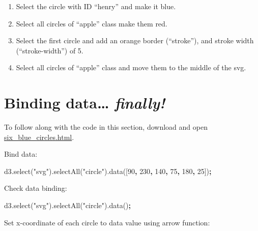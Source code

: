 \documentclass[openany]{book}
\newenvironment{Shaded}{\begin{snugshade}}{\end{snugshade}}
\newcommand{\AttributeTok}[1]{\textcolor[rgb]{0.77,0.63,0.00}{#1}}
\newcommand{\DecValTok}[1]{\textcolor[rgb]{0.00,0.00,0.81}{#1}}
\newcommand{\NormalTok}[1]{#1}
\newcommand{\OperatorTok}[1]{\textcolor[rgb]{0.81,0.36,0.00}{\textbf{#1}}}
\newcommand{\StringTok}[1]{\textcolor[rgb]{0.31,0.60,0.02}{#1}}
\newcommand{\VariableTok}[1]{\textcolor[rgb]{0.00,0.00,0.00}{#1}}
\begin{document}
\begin{enumerate}
\def\labelenumi{\arabic{enumi}.}
\item
  Select the circle with ID ``henry'' and make it blue.
\item
  Select all circles of ``apple'' class make them red.
\item
  Select the first circle and add an orange border (``stroke''), and stroke width (``stroke-width'') of 5.
\item
  Select all circles of ``apple'' class and move them to the middle of the svg.
\end{enumerate}

\hypertarget{binding-data-finally}{%
\section{\texorpdfstring{Binding data\ldots{} \emph{finally!} }{Binding data\ldots{} finally! }}\label{binding-data-finally}}

To follow along with the code in this section, download and open \href{https://raw.githubusercontent.com/jtr13/d3book/master/code/six_blue_circles.html}{six\_blue\_circles.html}.

Bind data:

\begin{Shaded}
\begin{Highlighting}[]
\VariableTok{d3}\NormalTok{.}\AttributeTok{select}\NormalTok{(}\StringTok{"svg"}\NormalTok{).}\AttributeTok{selectAll}\NormalTok{(}\StringTok{"circle"}\NormalTok{).}\AttributeTok{data}\NormalTok{([}\DecValTok{90}\OperatorTok{,} \DecValTok{230}\OperatorTok{,} \DecValTok{140}\OperatorTok{,} \DecValTok{75}\OperatorTok{,} \DecValTok{180}\OperatorTok{,} \DecValTok{25}\NormalTok{])}\OperatorTok{;}
\end{Highlighting}
\end{Shaded}

Check data binding:

\begin{Shaded}
\begin{Highlighting}[]
\VariableTok{d3}\NormalTok{.}\AttributeTok{select}\NormalTok{(}\StringTok{"svg"}\NormalTok{).}\AttributeTok{selectAll}\NormalTok{(}\StringTok{"circle"}\NormalTok{).}\AttributeTok{data}\NormalTok{()}\OperatorTok{;}
\end{Highlighting}
\end{Shaded}

Set x-coordinate of each circle to data value using arrow function:
\end{document}
